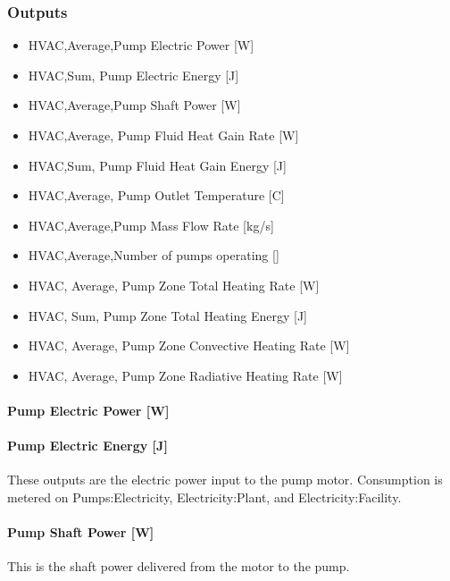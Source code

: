 \subsubsection{Outputs}\label{outputs-4-011}

\begin{itemize}
\item
  HVAC,Average,Pump Electric Power {[}W{]}
\item
  HVAC,Sum, Pump Electric Energy {[}J{]}
\item
  HVAC,Average,Pump Shaft Power {[}W{]}
\item
  HVAC,Average, Pump Fluid Heat Gain Rate {[}W{]}
\item
  HVAC,Sum, Pump Fluid Heat Gain Energy {[}J{]}
\item
  HVAC,Average, Pump Outlet Temperature {[}C{]}
\item
  HVAC,Average,Pump Mass Flow Rate {[}kg/s{]}
\item
  HVAC,Average,Number of pumps operating {[]}
\item
  HVAC, Average, Pump Zone Total Heating Rate {[}W{]}
\item
  HVAC, Sum, Pump Zone Total Heating Energy {[}J{]}
\item
  HVAC, Average, Pump Zone Convective Heating Rate {[}W{]}
\item
  HVAC, Average, Pump Zone Radiative Heating Rate {[}W{]}
\end{itemize}

\paragraph{Pump Electric Power {[}W{]}}\label{pump-electric-power-w-4}

\paragraph{Pump Electric Energy {[}J{]}}\label{pump-electric-energy-j-4}

These outputs are the electric power input to the pump motor. Consumption is metered on Pumps:Electricity, Electricity:Plant, and Electricity:Facility.

\paragraph{Pump Shaft Power {[}W{]}}\label{pump-shaft-power-w-4}

This is the shaft power delivered from the motor to the pump.


